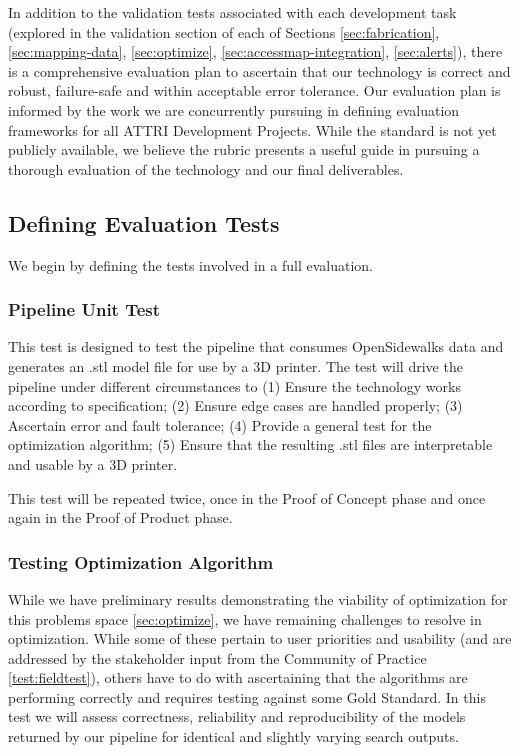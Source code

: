 
\label{sec:evaluation}

In addition to the validation tests associated with each development task (explored in the validation section of each of Sections \ref{sec:fabrication}, \ref{sec:mapping-data}, \ref{sec:optimize}, \ref{sec:accessmap-integration}, \ref{sec:alerts}), there is a comprehensive evaluation plan to ascertain that our technology is correct and robust, failure-safe and within acceptable error tolerance.
Our evaluation plan is informed by the work we are concurrently pursuing in defining evaluation frameworks for all ATTRI Development Projects. While the standard is not yet publicly available, we believe the rubric presents a useful guide in pursuing a thorough evaluation of the technology and our final deliverables. 

\subsection{Defining Evaluation Tests}
We begin by defining the tests involved in a full evaluation. 

\subsubsection{Pipeline Unit Test}
\label{test:pipeline}
This test is designed to test the pipeline that consumes OpenSidewalks data and generates an .stl model file for use by a 3D printer. The test will drive the pipeline under different circumstances to (1) Ensure the technology works according to specification; (2) Ensure edge cases are handled properly; (3) Ascertain error and fault tolerance; (4) Provide a general test for the optimization algorithm; (5) Ensure that the resulting .stl files are interpretable and usable by a 3D printer.

This test will be repeated twice, once in the Proof of Concept phase and once again in the Proof of Product phase.

\subsubsection{Testing Optimization Algorithm}
While we have preliminary results demonstrating the viability of optimization for this problems space \ref{sec:optimize}, we have remaining challenges to resolve in optimization. While some of these pertain to user priorities and usability (and are addressed by the
stakeholder input from the Community of Practice \ref{test:fieldtest}), others have to do with ascertaining that the algorithms are performing correctly and requires testing against some Gold Standard.
In this test we will assess correctness, reliability and reproducibility of the models returned by our pipeline for identical and slightly varying search outputs.


